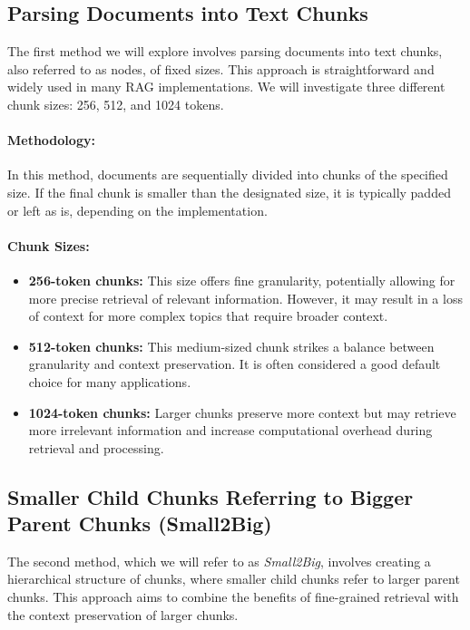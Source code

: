 \subsection{Parsing Documents into Text Chunks}\label{subsec:parsing-documents-into-text-chunks}
The first method we will explore involves parsing documents into text chunks, also referred to as nodes, of fixed sizes.
This approach is straightforward and widely used in many RAG implementations.
We will investigate three different chunk sizes: 256, 512, and 1024 tokens.
\paragraph{Methodology:}
In this method, documents are sequentially divided into chunks of the specified size.
If the final chunk is smaller than the designated size, it is typically padded or left as is, depending on the implementation.
\paragraph{Chunk Sizes:}
\begin{itemize}
    \item \textbf{256-token chunks:} This size offers fine granularity, potentially allowing for more precise retrieval of relevant information. However, it may result in a loss of context for more complex topics that require broader context.
    \item \textbf{512-token chunks:} This medium-sized chunk strikes a balance between granularity and context preservation. It is often considered a good default choice for many applications.
    \item \textbf{1024-token chunks:} Larger chunks preserve more context but may retrieve more irrelevant information and increase computational overhead during retrieval and processing.
\end{itemize}

\subsection{Smaller Child Chunks Referring to Bigger Parent Chunks (Small2Big)}\label{subsec:smaller-child-chunks-referring-to-bigger-parent-chunks}
The second method, which we will refer to as \textit{Small2Big}, involves creating a hierarchical structure of chunks, where smaller child chunks refer to larger parent chunks.
This approach aims to combine the benefits of fine-grained retrieval with the context preservation of larger chunks.
